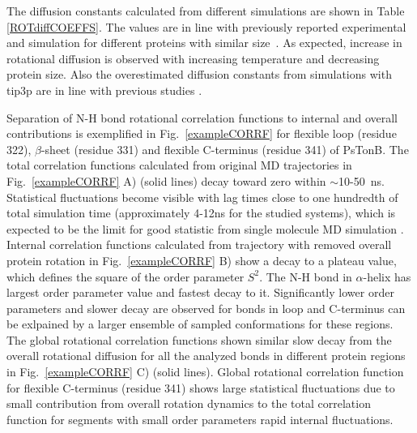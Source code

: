\documentclass[pre,aps,floatfix,authordate1-4,twocolumn]{revtex4-1}
\begin{document}
The diffusion constants calculated from different simulations are
shown in Table \ref{ROTdiffCOEFFS}. The values are in line with
previously reported experimental and simulation for different proteins
with similar size~\cite{wong08,krishnan98}. As expected, increase in
rotational diffusion is observed with increasing temperature and decreasing
protein size. Also the overestimated diffusion constants from simulations
with tip3p are in line with previous studies \cite{wong08}.

Separation of N-H bond rotational correlation functions
to internal and overall contributions is exemplified in
Fig.~\ref{exampleCORRF} for flexible loop (residue 322),
$\beta$-sheet (residue 331) and flexible C-terminus (residue 341) of PsTonB.
The total correlation functions calculated from original MD trajectories
in Fig.~\ref{exampleCORRF} A) (solid lines) decay toward zero within $\sim$10-50~ns.
Statistical fluctuations become visible with lag times close to one
hundredth of total simulation time (approximately 4-12ns for the studied systems),
which is expected to be the limit for good statistic from single molecule MD simulation \cite{lu06}.
Internal correlation functions calculated from trajectory with removed overall
protein rotation in Fig.~\ref{exampleCORRF} B) show a decay to a
plateau value, which defines the square of the order parameter $S^2$.
The N-H bond in $\alpha$-helix has largest order parameter value
and fastest decay to it. Significantly lower order parameters and
slower decay are observed for bonds in loop and C-terminus 
can be exlpained by a larger ensemble of sampled conformations for these regions.
The global rotational correlation functions shown similar slow decay
from the overall rotational diffusion
for all the analyzed bonds in different protein regions in Fig.~\ref{exampleCORRF} C) (solid lines).
Global rotational correlation function for flexible C-terminus (residue 341) shows
large statistical fluctuations due to small contribution from overall rotation
dynamics to the total correlation function for segments with small order parameters
rapid internal fluctuations.
\end{document}
